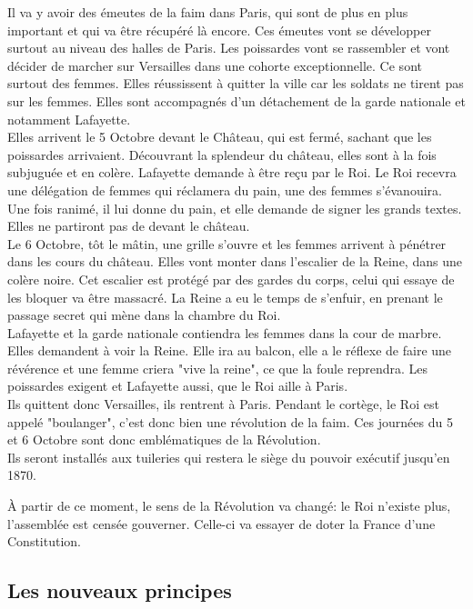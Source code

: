 \documentclass[10pt, a4paper, openany]{book}
\begin{document}
Il va y avoir des émeutes de la faim dans Paris, qui sont de plus en plus important et qui va être récupéré là encore. Ces émeutes vont se développer surtout au niveau des halles de Paris. Les poissardes vont se rassembler et vont décider de marcher sur Versailles dans une cohorte exceptionnelle. Ce sont surtout des femmes. Elles réussissent à quitter la ville car les soldats ne tirent pas sur les femmes. Elles sont accompagnés d'un détachement de la garde nationale et notamment Lafayette. \\
Elles arrivent le 5 Octobre devant le Château, qui est fermé, sachant que les poissardes arrivaient. Découvrant la splendeur du château, elles sont à la fois subjuguée et en colère. Lafayette demande à être reçu par le Roi. Le Roi recevra une délégation de femmes qui réclamera du pain, une des femmes s'évanouira. Une fois ranimé, il lui donne du pain, et elle demande de signer les grands textes. \\
Elles ne partiront pas de devant le château. \\
Le 6 Octobre, tôt le mâtin, une grille s'ouvre et les femmes arrivent à pénétrer dans les cours du château. Elles vont monter dans l'escalier de la Reine, dans une colère noire. Cet escalier est protégé par des gardes du corps, celui qui essaye de les bloquer va être massacré. La Reine a eu le temps de s'enfuir, en prenant le passage secret qui mène dans la chambre du Roi. \\
Lafayette et la garde nationale contiendra les femmes dans la cour de marbre. Elles demandent à voir la Reine. Elle ira au balcon, elle a le réflexe de faire une révérence et une femme criera "vive la reine", ce que la foule reprendra. Les poissardes exigent et Lafayette aussi, que le Roi aille à Paris. \\
Ils quittent donc Versailles, ils rentrent à Paris. Pendant le cortège, le Roi est appelé "boulanger", c'est donc bien une révolution de la faim. Ces journées du 5 et 6 Octobre sont donc emblématiques de la Révolution. \\
Ils seront installés aux tuileries qui restera le siège du pouvoir exécutif jusqu'en 1870.


À partir de ce moment, le sens de la Révolution va changé: le Roi n'existe plus, l'assemblée est censée gouverner. Celle-ci va essayer de doter la France d'une Constitution. 

\subsection{Les nouveaux principes}
\end{document}
